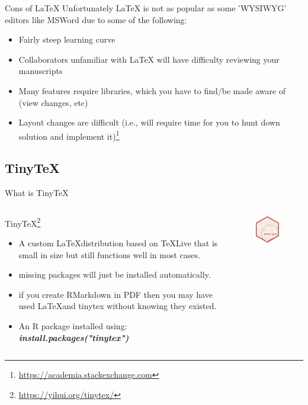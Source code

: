 \documentclass[fleqn]{beamer}\usepackage[]{graphicx}\usepackage[]{color}
\begin{document}
\begin{frame}{Cons of \LaTeX{}}
  Unfortunately \LaTeX{} is not as popular as some 'WYSIWYG' editors like MSWord due to some of the following:
  \begin{itemize}%
    \item Fairly steep learning curve
    \item Collaborators unfamiliar with LaTeX will have difficulty reviewing your manuscripts
    \item Many features require libraries, which you have to find/be made aware of (view changes, etc)
    \item Layout changes are difficult (i.e., will require time for you to hunt down solution and implement it)\footnote{\href{https://academia.stackexchange.com/questions/5414/what-are-the-advantages-or-disadvantages-of-using-latex-for-writing-scientific-p}{https://academia.stackexchange.com}}
  \end{itemize}
\end{frame}

\subsection{TinyTeX}
\begin{frame}{What is TinyTeX}
\begin{columns}[T] %
\begin{column}{.48\textwidth}
TinyTeX\footnote{\href{https://yihui.org/tinytex/}{https://yihui.org/tinytex/}}
\begin{itemize}
  \item A custom \LaTeX distribution based on \TeX Live that is small in size but still functions well in most cases. 
  \item missing packages will just be installed automatically. 
  \item if you create RMarkdown in PDF then you may have used \LaTeX and tinytex without knowing they existed.
  \item An R package installed using: \textit{\textbf{install.packages("tinytex")}}
\end{itemize}
\end{column}%
\hfill%
\begin{column}{.48\textwidth}
\begin{figure}[htp]
    \centering
    \includegraphics[width=4cm]{logo-tinytex}
\end{figure}
\end{column}%
\end{columns}
\end{frame}
\end{document}

